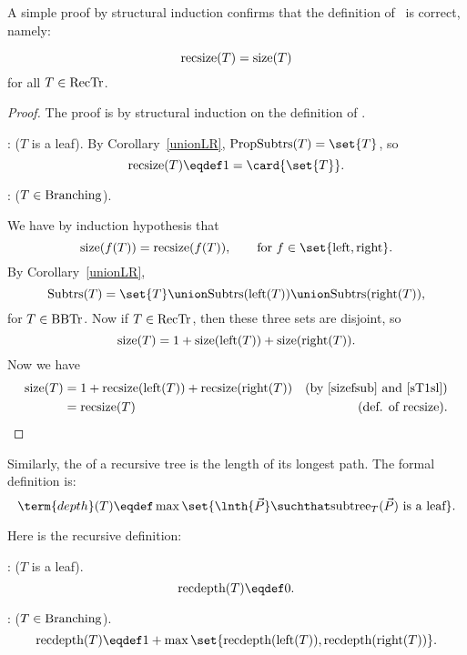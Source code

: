 A simple proof by structural induction confirms that the definition of
\trsize{}\ is correct, namely:
\begin{lemma}\label{}
\[
\text{recsize}(T) = \text{size}(T)
\]
for all $T \in \text{RecTr}$.

\begin{proof}
The proof is by structural induction on the definition of \rectr.

: ($T$ is a leaf).
By Corollary~\ref{unionLR}, $\propbrn{T} = \set{T}$, so
\[
\trsize{(T)} \eqdef 1 = \card{\set{T}}.
\]

: ($T \in\text{Branching}$).

We have by induction hypothesis that
\begin{equation}\label{sizefsub}
\text{size}(f(T)) = \trsize{(f(T))}, \qquad  \text{for}\ f \in \set{\leftsub{}, \rightsub{}}.
\end{equation}
By Corollary~\ref{unionLR},
\[
\subbrn{T} = \set{T} \union \subbrn{\leftsub{(T)}} \union \subbrn{\rightsub{(T)}},
\]
for $T \in \text{BBTr}$.  Now if $T \in \text{RecTr}$, then these three sets are disjoint, so
\begin{equation}\label{sT1sl}
\text{size}(T) = 1 + \text{size}(\text{left}(T)) + \text{size}(\text{right}(T)).
\end{equation}
Now we have
\begin{align*}
\text{size}(T)
 & = 1 + \text{recsize}(\text{left}(T)) + \text{recsize}(\text{right}(T))
   & \text{(by~\eqref{sizefsub} and~\eqref{sT1sl})}\\
 & = \text{recsize}(T) 
   & \text{(def. of \text{recsize})}.
\end{align*}
\end{proof}
\end{lemma}

Similarly, the  of a recursive tree is the length of its
longest path.  The formal definition is:
\begin{equation}\label{defdepth}
\term{depth}(T) \eqdef \max \set{\lnth{\vec{P}} \suchthat
  \rslt{T}{(\vec{P})}\ \text{is a leaf}}.
\end{equation}

Here is the recursive definition:
\begin{definition}
: ($T$ is a leaf).
\[
\trdpth{(T)} \eqdef 0.
\]

: ($T \in\text{Branching}$).
\[
\trdpth{(T)} \eqdef 1+\max\set{\trdpth{(\leftsub{(T)})}, \trdpth{(\rightsub{(T)})}}.
\]
\end{definition}

